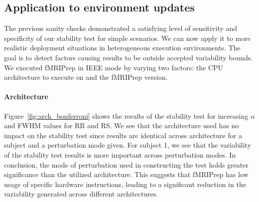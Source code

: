 \documentclass[lettersize,journal]{IEEEtran}
\newcommand{\fmriprep}{fMRIPrep\xspace}
\begin{document}
\subsection{Application to environment updates}

The previous sanity checks demonstrated a satisfying level of sensitivity and specificity of our stability test for simple scenarios. We can now apply it to more realistic deployment situations in heterogeneous execution environments.
The goal is to detect factors causing results to be outside accepted variability bounds. We executed \fmriprep in IEEE mode by varying two factors: the CPU architecture to execute on and the \fmriprep version.

\paragraph*{Architecture} Figure~\ref{fig:arch_bonferroni} shows the results of the stability test for increasing $\alpha$ and FWHM values for RR and RS. We see that the architecture used has no impact on the stability test since results are identical across architecture for a subject and a perturbation mode given. For subject 1, we see that the variability of the stability test results is more important across perturbation modes.
In conclusion, the mode of perturbation used in constructing the test holds greater significance than the utilized architecture. This suggests that \fmriprep has low usage of specific hardware instructions, leading to a significant reduction in the variability generated across different architectures.
\end{document}
